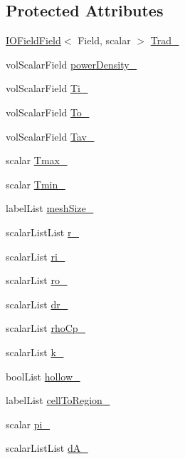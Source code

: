 \subsection*{Protected Attributes}
\begin{DoxyCompactItemize}
\item 
\hyperlink{classFoam_1_1IOFieldField}{I\+O\+Field\+Field}$<$ Field, scalar $>$ \hyperlink{classFoam_1_1powerModels_1_1heatedPin_a22d48bd29c42258de0a8c6a599dafecd}{Trad\+\_\+}
\item 
vol\+Scalar\+Field \hyperlink{classFoam_1_1powerModels_1_1heatedPin_afcf025ab8119485c105d92f3ba72a4fd}{power\+Density\+\_\+}
\item 
vol\+Scalar\+Field \hyperlink{classFoam_1_1powerModels_1_1heatedPin_aa4f0782fdade074a9695a10f866cd356}{Ti\+\_\+}
\item 
vol\+Scalar\+Field \hyperlink{classFoam_1_1powerModels_1_1heatedPin_ac1a63c5a5148db2116ef7d7f4fb8e5e6}{To\+\_\+}
\item 
vol\+Scalar\+Field \hyperlink{classFoam_1_1powerModels_1_1heatedPin_ad263fa9ac406fedf63736c386232471c}{Tav\+\_\+}
\item 
scalar \hyperlink{classFoam_1_1powerModels_1_1heatedPin_ab08b10458ae43fd63cb02768b015095b}{Tmax\+\_\+}
\item 
scalar \hyperlink{classFoam_1_1powerModels_1_1heatedPin_ab81c0e4420b8d49b238517e5038f30f3}{Tmin\+\_\+}
\item 
label\+List \hyperlink{classFoam_1_1powerModels_1_1heatedPin_ab7f0900e368fb0af4fd3d27ce2b5030d}{mesh\+Size\+\_\+}
\item 
scalar\+List\+List \hyperlink{classFoam_1_1powerModels_1_1heatedPin_a884336479d8b085765a84acff7c77bf6}{r\+\_\+}
\item 
scalar\+List \hyperlink{classFoam_1_1powerModels_1_1heatedPin_aa131629bd73df99e2ae5d2b58b3dffd7}{ri\+\_\+}
\item 
scalar\+List \hyperlink{classFoam_1_1powerModels_1_1heatedPin_a2e4ddd63c143410b9bc1ba4185583707}{ro\+\_\+}
\item 
scalar\+List \hyperlink{classFoam_1_1powerModels_1_1heatedPin_ab2cf2952c649aa40087edcc0bcd82b32}{dr\+\_\+}
\item 
scalar\+List \hyperlink{classFoam_1_1powerModels_1_1heatedPin_a1d1145c4adf45e80a6561a9e0b89cfc7}{rho\+Cp\+\_\+}
\item 
scalar\+List \hyperlink{classFoam_1_1powerModels_1_1heatedPin_ad9cdb67a87b764873fc0bf374be5d7b6}{k\+\_\+}
\item 
bool\+List \hyperlink{classFoam_1_1powerModels_1_1heatedPin_a8d03cb3417a7ad31230b590f56d52b5e}{hollow\+\_\+}
\item 
label\+List \hyperlink{classFoam_1_1powerModels_1_1heatedPin_a701d76c4cc33a9d530a0d2b7f21c206a}{cell\+To\+Region\+\_\+}
\item 
scalar \hyperlink{classFoam_1_1powerModels_1_1heatedPin_ad7683f85f3785b9444544d92fcfc3e1d}{pi\+\_\+}
\item 
scalar\+List\+List \hyperlink{classFoam_1_1powerModels_1_1heatedPin_a753fe594accfbeba343f55dfdf274a0f}{d\+A\+\_\+}
\end{DoxyCompactItemize}
